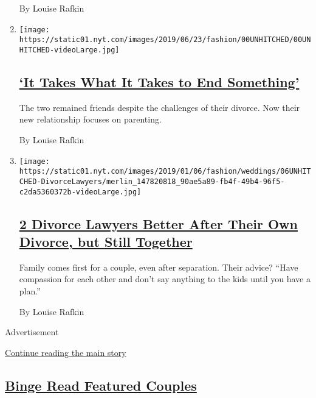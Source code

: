 \begin{enumerate}
  By Louise Rafkin
\item
  \texttt{[image: https://static01.nyt.com/images/2019/06/23/fashion/00UNHITCHED/00UNHITCHED-videoLarge.jpg]}

  \hypertarget{it-takes-what-it-takes-to-end-something}{%
  \subsection{\texorpdfstring{\href{/2019/06/18/style/it-takes-what-it-takes-to-end-something.html}{`It
  Takes What It Takes to End
  Something'}}{`It Takes What It Takes to End Something'}}\label{it-takes-what-it-takes-to-end-something}}

  The two remained friends despite the challenges of their divorce. Now
  their new relationship focuses on parenting.

  By Louise Rafkin
\item
  \texttt{[image: https://static01.nyt.com/images/2019/01/06/fashion/weddings/06UNHITCHED-DivorceLawyers/merlin\_147820818\_90ae5a89-fb4f-49b4-96f5-c2da5360372b-videoLarge.jpg]}

  \hypertarget{2-divorce-lawyers-better-after-their-own-divorce-but-still-together}{%
  \subsection{\texorpdfstring{\href{/2019/01/03/fashion/weddings/2-divorce-lawyers-better-after-their-own-divorce-but-still-together.html}{2
  Divorce Lawyers Better After Their Own Divorce, but Still
  Together}}{2 Divorce Lawyers Better After Their Own Divorce, but Still Together}}\label{2-divorce-lawyers-better-after-their-own-divorce-but-still-together}}

  Family comes first for a couple, even after separation. Their advice?
  ``Have compassion for each other and don't say anything to the kids
  until you have a plan.''

  By Louise Rafkin
\end{enumerate}

Advertisement

\protect\hyperlink{after-mid4}{Continue reading the main story}

\hypertarget{binge-read-featured-couples}{%
\subsection{\texorpdfstring{\href{/spotlight/wedding-announcements}{Binge
Read Featured
Couples}}{Binge Read Featured Couples}}\label{binge-read-featured-couples}}

